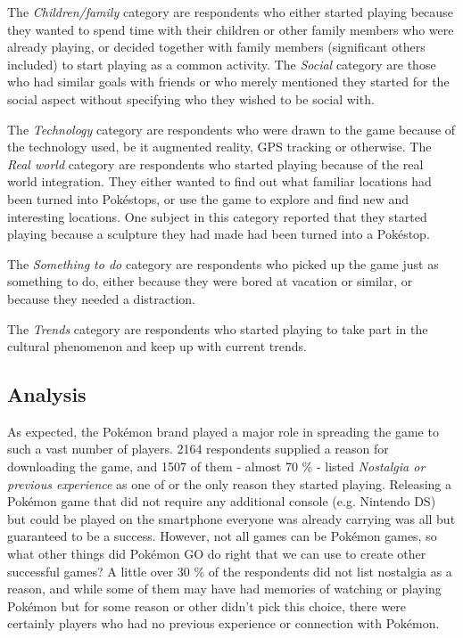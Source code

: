 The \emph{Children/family} category are respondents who either started playing because they wanted to spend time with their children or other family members who were already playing, or decided together with family members (significant others included) to start playing as a common activity. The \emph{Social} category are those who had similar goals with friends or who merely mentioned they started for the social aspect without specifying who they wished to be social with.

The \emph{Technology} category are respondents who were drawn to the game because of the technology used, be it augmented reality, GPS tracking or otherwise. The \emph{Real world} category are respondents who started playing because of the real world integration. They either wanted to find out what familiar locations had been turned into Pokéstops, or use the game to explore and find new and interesting locations. One subject in this category reported that they started playing because a sculpture they had made had been turned into a Pokéstop.

The \emph{Something to do} category are respondents who picked up the game just as something to do, either because they were bored at vacation or similar, or because they needed a distraction.

The \emph{Trends} category are respondents who started playing to take part in the cultural phenomenon and keep up with current trends.



\subsection{Analysis}

As expected, the Pokémon brand played a major role in spreading the game to such a vast number of players. 2164 respondents supplied a reason for downloading the game, and 1507 of them - almost 70 \% - listed \emph{Nostalgia or previous experience} as one of or the only reason they started playing. Releasing a Pokémon game that did not require any additional console (e.g. Nintendo DS) but could be played on the smartphone everyone was already carrying was all but guaranteed to be a success. However, not all games can be Pokémon games, so what other things did Pokémon GO do right that we can use to create other successful games? A little over 30 \% of the respondents did not list nostalgia as a reason, and while some of them may have had memories of watching or playing Pokémon but for some reason or other didn't pick this choice, there were certainly players who had no previous experience or connection with Pokémon.

